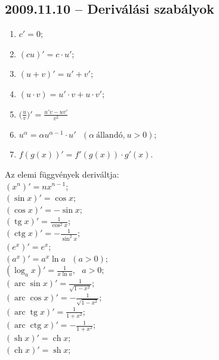 \documentclass{article}
\newcommand{\tg}{\mathop{\mathrm{tg}}\nolimits}
\newcommand{\ctg}{\mathop{\mathrm{ctg}}\nolimits}
\newcommand{\arc}{\mathop{\mathrm{arc}}\nolimits}
\renewcommand{\arcsin}{\arc\sin}
\renewcommand{\arccos}{\arc\cos}
\newcommand{\arctg}{\arc\tg}
\newcommand{\arcctg}{\arc\ctg}
\newcommand{\sh}{\mathop{\mathrm{sh}}\nolimits}
\newcommand{\ch}{\mathop{\mathrm{ch}}\nolimits}
\begin{document}
\subsection*{2009.11.10 -- Deriválási szabályok}
\begin{enumerate}
\item $c'=0$;
\item $(cu)'=c\cdot u'$;
\item $(u+v)'=u'+v'$;
\item $(u\cdot v)= u'\cdot v + u\cdot v'$;
\item $\big(\frac{u}{v}\big)'=\frac{u'v-uv'}{v^2}$
\item $u^\alpha = \alpha u^{\alpha-1}\cdot u' ~~~(\alpha~\text{állandó,}~u>0) $;
\item $f(g(x))'=f'(g(x))\cdot g'(x)$.
\end{enumerate}
Az elemi függvények deriváltja:\\
$(x^n)'=nx^{n-1}$;\\
$(\sin x)'=\cos x $;\\
$(\cos x)'=-\sin x $;\\
$(\tg x)'=\frac{1}{\cos^2 x} $;\\
$(\ctg x)'=-\frac{1}{\sin^2 x} $;\\
$(e^x)'=e^x $;\\
$(a^x)'=a^x \ln a~~~(a>0) $;\\
$(\log_a x)'=\frac{1}{x \ln a},~~~a>0 $;\\
$(\arcsin x)'=\frac{1}{\sqrt{1-x^2}} $;\\
$(\arccos x)'=-\frac{1}{\sqrt{1-x^2}}$;\\
$(\arctg x)'=\frac{1}{1+x^2} $;\\
$(\arcctg x)'=-\frac{1}{1+x^2} $;\\
$(\sh x)'=\ch x $;\\
$(\ch x)'=\sh x $;\\
\end{document}
